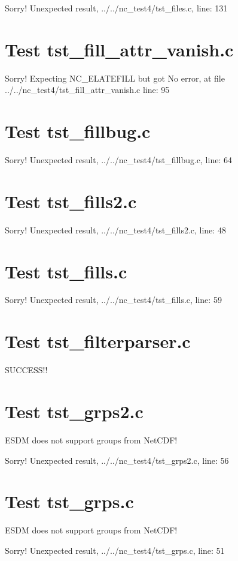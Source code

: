 Sorry! Unexpected result, ../../nc\_test4/tst\_files.c, line: 131

\section{Test tst\_fill\_attr\_vanish.c}

Sorry! Expecting NC\_ELATEFILL but got No error, at file ../../nc\_test4/tst\_fill\_attr\_vanish.c line: 95

\section{Test tst\_fillbug.c}

Sorry! Unexpected result, ../../nc\_test4/tst\_fillbug.c, line: 64

\section{Test tst\_fills2.c}

Sorry! Unexpected result, ../../nc\_test4/tst\_fills2.c, line: 48

\section{Test tst\_fills.c}

Sorry! Unexpected result, ../../nc\_test4/tst\_fills.c, line: 59

\section{Test tst\_filterparser.c}

SUCCESS!!

\section{Test tst\_grps2.c}

ESDM does not support groups from NetCDF!

Sorry! Unexpected result, ../../nc\_test4/tst\_grps2.c, line: 56

\section{Test tst\_grps.c}

ESDM does not support groups from NetCDF!

Sorry! Unexpected result, ../../nc\_test4/tst\_grps.c, line: 51

